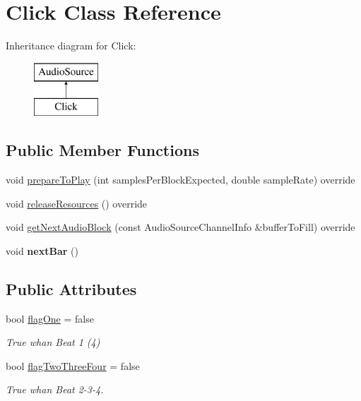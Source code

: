 \hypertarget{class_click}{}\section{Click Class Reference}
\label{class_click}
Inheritance diagram for Click\+:\begin{figure}[H]
\begin{center}
\leavevmode
\includegraphics[height=2.000000cm]{class_click}
\end{center}
\end{figure}
\subsection*{Public Member Functions}
\begin{DoxyCompactItemize}
\item 
void \mbox{\hyperlink{class_click_af29c8f44f7aa61e1b2f6e46707a4d41f}{prepare\+To\+Play}} (int samples\+Per\+Block\+Expected, double sample\+Rate) override
\item 
void \mbox{\hyperlink{class_click_a0be55e26561673ceeabe98d448473e0f}{release\+Resources}} () override
\item 
void \mbox{\hyperlink{class_click_a3ad8a5e5f437567b8463df32446737d9}{get\+Next\+Audio\+Block}} (const Audio\+Source\+Channel\+Info \&buffer\+To\+Fill) override
\item 
\mbox{\label{class_click_aa03bec0044701c85bdb65ae22274aeed}} 
void {\bfseries next\+Bar} ()
\end{DoxyCompactItemize}
\subsection*{Public Attributes}
\begin{DoxyCompactItemize}
\item 
\mbox{\label{class_click_a101a9f477f39fc074784b222e4ce9fe9}} 
bool \mbox{\hyperlink{class_click_a101a9f477f39fc074784b222e4ce9fe9}{flag\+One}} = false
\begin{DoxyCompactList}\small\item\em True whan Beat 1 (4) \end{DoxyCompactList}\item 
\mbox{\label{class_click_a8f40e52e0f3c23fee82dc1658144c0d0}} 
bool \mbox{\hyperlink{class_click_a8f40e52e0f3c23fee82dc1658144c0d0}{flag\+Two\+Three\+Four}} = false
\begin{DoxyCompactList}\small\item\em True whan Beat 2-\/3-\/4. \end{DoxyCompactList}\end{DoxyCompactItemize}


